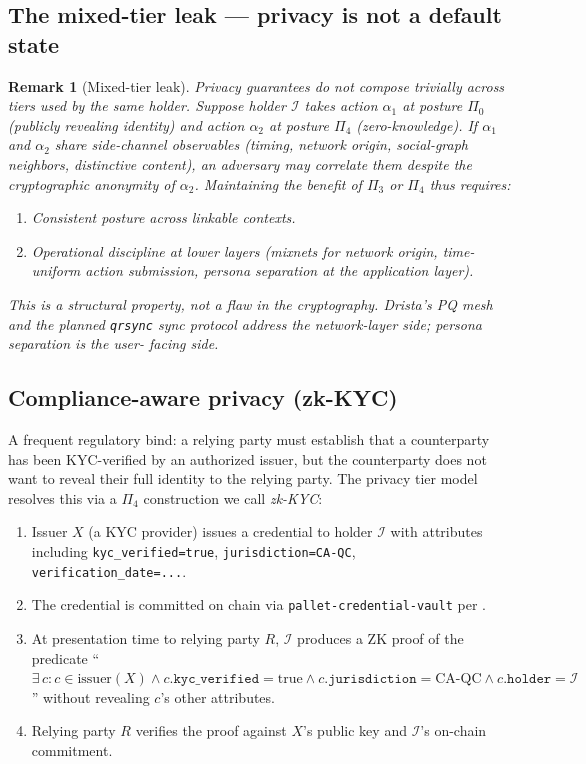 \documentclass[11pt,a4paper,parskip=half-,DIV=12,headings=standardclasses]{scrartcl}
\theoremstyle{ncthm}
\theoremstyle{ncdef}
\newtheorem{remark}[theorem]{Remark}
\newcommand{\identity}{\mathcal{I}}
\begin{document}
\subsection{The mixed-tier leak --- privacy is not a default state}

\begin{remark}[Mixed-tier leak]\label{rem:mixed-tier-leak}
Privacy guarantees do not compose trivially across tiers used by the
same holder. Suppose holder $\identity$ takes action $\alpha_1$ at
posture $\Pi_0$ (publicly revealing identity) and action $\alpha_2$ at
posture $\Pi_4$ (zero-knowledge). If $\alpha_1$ and $\alpha_2$ share
side-channel observables (timing, network origin, social-graph
neighbors, distinctive content), an adversary may correlate them
despite the cryptographic anonymity of $\alpha_2$. Maintaining the
benefit of $\Pi_3$ or $\Pi_4$ thus requires:
\begin{enumerate}
\item Consistent posture across linkable contexts.
\item Operational discipline at lower layers (mixnets for network
  origin, time-uniform action submission, persona separation at the
  application layer).
\end{enumerate}
This is a structural property, not a flaw in the cryptography.
Drista's PQ mesh and the planned \texttt{qrsync} sync protocol
address the network-layer side; persona separation is the user-
facing side.
\end{remark}

\subsection{Compliance-aware privacy (zk-KYC)}

A frequent regulatory bind: a relying party must establish that a
counterparty has been KYC-verified by an authorized issuer, but the
counterparty does not want to reveal their full identity to the
relying party. The privacy tier model resolves this via a $\Pi_4$
construction we call \emph{zk-KYC}:

\begin{enumerate}
\item Issuer $X$ (a KYC provider) issues a credential to holder
  $\identity$ with attributes including
  \texttt{kyc\_verified=true}, \texttt{jurisdiction=CA-QC},
  \texttt{verification\_date=...}.
\item The credential is committed on chain via
  \texttt{pallet-credential-vault} per
  .
\item At presentation time to relying party $R$, $\identity$ produces
  a ZK proof of the predicate
  ``$\exists\,c : c \in \mathrm{issuer}(X) \land
  c.\mathtt{kyc\_verified} = \mathrm{true} \land
  c.\mathtt{jurisdiction} = \mathrm{CA\text{-}QC} \land
  c.\mathtt{holder} = \identity$''
  without revealing $c$'s other attributes.
\item Relying party $R$ verifies the proof against $X$'s public key
  and $\identity$'s on-chain commitment.
\end{enumerate}
\end{document}
